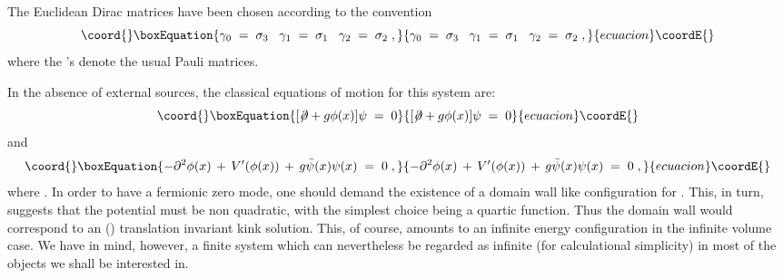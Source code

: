 \documentclass[a4paper,12pt]{article}
\begin{document}
The Euclidean Dirac matrices \myHighlight{$\gamma_\mu$}\coordHE{} have been chosen according
to the convention
\begin{equation}\coord{}\boxEquation{\label{dfgp}
\gamma_0\;=\;\sigma_3 \;\;\;\gamma_1\;=\;\sigma_1 
\;\;\;\gamma_2\;=\;\sigma_2\;,
}{\gamma_0\;=\;\sigma_3 \;\;\;\gamma_1\;=\;\sigma_1 
\;\;\;\gamma_2\;=\;\sigma_2\;,
}{ecuacion}\coordE{}\end{equation}
where the \myHighlight{$\sigma_\alpha$}\coordHE{}'s denote the usual Pauli matrices.

In the absence of external sources, the classical equations of motion
for this system are:
\begin{equation}\coord{}\boxEquation{
  \label{eq:eqom1}
[\not\!\partial + g \phi(x) ] \psi \;=\;0 
}{
  [\not\!\partial + g \phi(x) ] \psi \;=\;0 
}{ecuacion}\coordE{}\end{equation} 
and
\begin{equation}\coord{}\boxEquation{
  \label{eq:eqom2}
- \partial^2 \phi (x) \,+\, V'(\phi(x)) \,+\, g {\bar\psi}(x) \psi(x) \;=\; 0 \;,
}{
  - \partial^2 \phi (x) \,+\, V'(\phi(x)) \,+\, g {\bar\psi}(x) \psi(x) \;=\; 0 \;,
}{ecuacion}\coordE{}\end{equation}
where \coordHE{}.  In order to have a fermionic
zero mode, one should demand the existence of a domain wall like
configuration for \myHighlight{$\phi$}\coordHE{}. This, in turn, suggests that the potential
\coordHE{} must be non quadratic, with the simplest choice being a quartic
function. Thus the domain wall would correspond to an (\coordHE{}) 
translation invariant kink solution.  This, of course, amounts 
to an infinite energy configuration in the infinite volume case. 
We have in mind, however, a finite system which can nevertheless 
be regarded  as infinite (for calculational simplicity) in most of the
objects we shall be interested in. 
\end{document}
